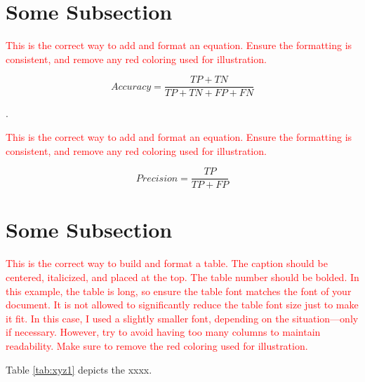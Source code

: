 \lipsum[1]

\section{Some Subsection}

 
\lipsum[1]

\textcolor{red}{This is the correct way to add and format an equation. Ensure the formatting is consistent, and remove any red coloring used for illustration.}

\begin{equation}
Accuracy = \frac {TP+TN}  {TP+TN+FP+FN}
\end{equation}

\lipsum[1].  

\textcolor{red}{This is the correct way to add and format an equation. Ensure the formatting is consistent, and remove any red coloring used for illustration.}

\begin{equation}
Precision = \frac{TP}{TP+FP}
\end{equation}
 
 
\section{Some Subsection}

\lipsum[1] 

\textcolor{red}{This is the correct way to build and format a table. The caption should be centered, italicized, and placed at the top. The table number should be bolded. In this example, the table is long, so ensure the table font matches the font of your document. It is not allowed to significantly reduce the table font size just to make it fit. In this case, I used a slightly smaller font, depending on the situation—only if necessary. However, try to avoid having too many columns to maintain readability. Make sure to remove the red coloring used for illustration.}

Table \ref{tab:xyz1} depicts the xxxx.


 


